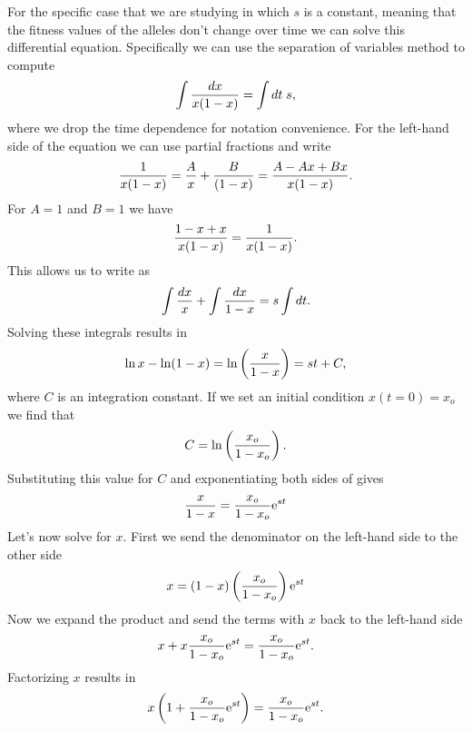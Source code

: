 For the specific case that we are studying in which $s$ is a constant, meaning
that the fitness values of the alleles don't change over time we can solve this
differential equation. Specifically we can use the separation of variables
method to compute
\begin{equation}
  \int {dx \over x(1 - x)} = \int dt \;s,
  \label{eq_sep_var}
\end{equation}
where we drop the time dependence for notation convenience. For the left-hand
side of the equation we can use partial fractions and write
\begin{equation}
  {1 \over x(1 - x)} = {A \over x} + {B \over (1 - x)}
  = {A - Ax + Bx \over x(1 - x)}.
\end{equation}
For $A = 1$ and $B = 1$ we have
\begin{equation}
  {1 - x + x \over x(1 - x)} = {1 \over x(1 - x)}.
\end{equation}
This allows us to write  as 
\begin{equation}
  \int {dx \over x} + \int {dx \over 1 - x} = s \int dt.
\end{equation}
Solving these integrals results in
\begin{equation}
  \ln x - \ln(1 - x) = \ln\left( {x \over 1 - x} \right) 
  = s t + C,
  \label{eq_sep_var_sol}
\end{equation}
where $C$ is an integration constant. If we set an initial condition $x(t = 0)
= x_o$ we find that
\begin{equation}
  C = \ln \left( {x_o \over 1 - x_o} \right).
\end{equation}
Substituting this value for $C$ and exponentiating both sides of
 gives
\begin{equation}
  {x \over 1 - x} = {x_o \over 1 - x_o} \mathrm{e}^{s t}
\end{equation}
Let's now solve for $x$. First we send the denominator on the left-hand side to
the other side
\begin{equation}
  x = (1 - x)\left( x_o \over 1 - x_o \right)\mathrm{e}^{st}
\end{equation}
Now we expand the product and send the terms with $x$ back to the left-hand
side
\begin{equation}
  x + x {x_o \over 1 - x_o}\mathrm{e}^{st} = {x_o \over 1 - x_o}\mathrm{e}^{st}.
\end{equation}
Factorizing $x$ results in
\begin{equation}
  x \left( 1 + {x_o \over 1 - x_o}\mathrm{e}^{st} \right) = {x_o \over 1 - x_o}\mathrm{e}^{st}.
\end{equation}
